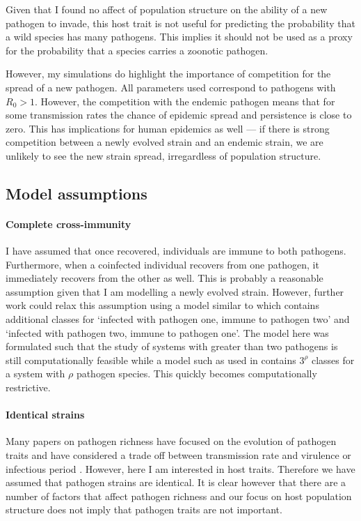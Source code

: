 Given that I found no affect of population structure on the ability of a new pathogen to invade, this host trait is not useful for predicting the probability that a wild species has many pathogens.
This implies it should not be used as a proxy for the probability that a species carries a zoonotic pathogen.

However, my simulations do highlight the importance of competition for the spread of a new pathogen.
All parameters used correspond to pathogens with $R_0>1$.
However, the competition with the endemic pathogen means that for some transmission rates the chance of epidemic spread and persistence is close to zero.
This has implications for human epidemics as well --- if there is strong competition between a newly evolved strain and an endemic strain, we are unlikely to see the new strain spread, irregardless of population structure.




\subsection{Model assumptions}

\paragraph{Complete cross-immunity}

I have assumed that once recovered, individuals are immune to both pathogens. 
Furthermore, when a coinfected individual recovers from one pathogen, it immediately recovers from the other as well.
This is probably a reasonable assumption given that I am modelling a newly evolved strain.
However, further work could relax this assumption using a model similar to \cite{poletto2015characterising} which contains additional classes for `infected with pathogen one, immune to pathogen two' and `infected with pathogen two, immune to pathogen one'.
The model here was formulated such that the study of systems with greater than two pathogens is still computationally feasible while a model such as used in \cite{poletto2015characterising} contains $3^\rho$ classes for a system with $\rho$ pathogen species.
This quickly becomes computationally restrictive.

\paragraph{Identical strains}

Many papers on pathogen richness have focused on the evolution of pathogen traits and have considered a trade off between transmission rate and virulence \cite{nowak1994superinfection, nowak1994superinfection} or infectious period \cite{poletto2013host}.
However, here I am interested in host traits.
Therefore we have assumed that pathogen strains are identical.
It is clear however that there are a number of factors that affect pathogen richness and our focus on host population structure does not imply that pathogen traits are not important.

